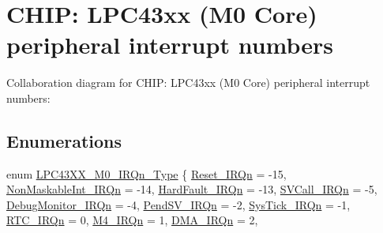 \hypertarget{group___c_m_s_i_s__43_x_x___m0___i_r_q}{}\section{C\+H\+IP\+: L\+P\+C43xx (M0 Core) peripheral interrupt numbers}
\label{group___c_m_s_i_s__43_x_x___m0___i_r_q}
Collaboration diagram for C\+H\+IP\+: L\+P\+C43xx (M0 Core) peripheral interrupt numbers\+:
\subsection*{Enumerations}
\begin{DoxyCompactItemize}
\item 
enum \hyperlink{group___c_m_s_i_s__43_x_x___m0___i_r_q_ga402456eb2f4f5b3dc2a53f725eed9485}{L\+P\+C43\+X\+X\+\_\+\+M0\+\_\+\+I\+R\+Qn\+\_\+\+Type} \{ \newline
\hyperlink{group___c_m_s_i_s__43_x_x___m0___i_r_q_gga402456eb2f4f5b3dc2a53f725eed9485a50ad21f2fd0d54d04b390d5a9145889a}{Reset\+\_\+\+I\+R\+Qn} = -\/15, 
\hyperlink{group___c_m_s_i_s__43_x_x___m0___i_r_q_gga402456eb2f4f5b3dc2a53f725eed9485ade177d9c70c89e084093024b932a4e30}{Non\+Maskable\+Int\+\_\+\+I\+R\+Qn} = -\/14, 
\hyperlink{group___c_m_s_i_s__43_x_x___m0___i_r_q_gga402456eb2f4f5b3dc2a53f725eed9485ab1a222a34a32f0ef5ac65e714efc1f85}{Hard\+Fault\+\_\+\+I\+R\+Qn} = -\/13, 
\hyperlink{group___c_m_s_i_s__43_x_x___m0___i_r_q_gga402456eb2f4f5b3dc2a53f725eed9485a4ce820b3cc6cf3a796b41aadc0cf1237}{S\+V\+Call\+\_\+\+I\+R\+Qn} = -\/5, 
\newline
\hyperlink{group___c_m_s_i_s__43_x_x___m0___i_r_q_gga402456eb2f4f5b3dc2a53f725eed9485a8e033fcef7aed98a31c60a7de206722c}{Debug\+Monitor\+\_\+\+I\+R\+Qn} = -\/4, 
\hyperlink{group___c_m_s_i_s__43_x_x___m0___i_r_q_gga402456eb2f4f5b3dc2a53f725eed9485a03c3cc89984928816d81793fc7bce4a2}{Pend\+S\+V\+\_\+\+I\+R\+Qn} = -\/2, 
\hyperlink{group___c_m_s_i_s__43_x_x___m0___i_r_q_gga402456eb2f4f5b3dc2a53f725eed9485a6dbff8f8543325f3474cbae2446776e7}{Sys\+Tick\+\_\+\+I\+R\+Qn} = -\/1, 
\hyperlink{group___c_m_s_i_s__43_x_x___m0___i_r_q_gga402456eb2f4f5b3dc2a53f725eed9485adcc0f2770f7f57f75fac3d8bcac0e858}{R\+T\+C\+\_\+\+I\+R\+Qn} = 0, 
\newline
\hyperlink{group___c_m_s_i_s__43_x_x___m0___i_r_q_gga402456eb2f4f5b3dc2a53f725eed9485afc37743619ad5c0be7c478e876966ee1}{M4\+\_\+\+I\+R\+Qn} = 1, 
\hyperlink{group___c_m_s_i_s__43_x_x___m0___i_r_q_gga402456eb2f4f5b3dc2a53f725eed9485a4968eb85558b7cd25e0f0fa1b839f881}{D\+M\+A\+\_\+\+I\+R\+Qn} = 2, 

\end{DoxyCompactItemize}
